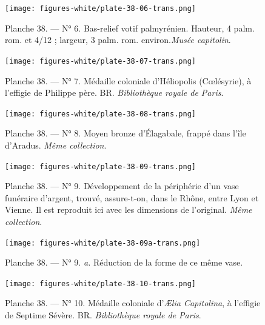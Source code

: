 \documentclass[a4paper, 11pt, oneside, polutonikogreek, french]{article}
\begin{document}
\begin{figure}[H]
\centering
\texttt{[image: figures-white/plate-38-06-trans.png]}
\caption[Planche 38. --- N° 6. Bas-relief votif palmyrénien. Hauteur, 4 palm. rom. et 4/12 ; largeur, 3 palm. rom. environ. \emph{Musée capitolin}.]{\scriptsize Planche 38. --- N° 6. Bas-relief votif palmyrénien. Hauteur, 4 palm. rom. et 4/12 ; largeur, 3 palm. rom. environ.\footnotemark \emph{Musée capitolin}.}
\end{figure}
\vspace*{\fill}
\clearpage
\vspace*{\fill}
\begin{figure}[H]
\centering
\texttt{[image: figures-white/plate-38-07-trans.png]}
\caption{\scriptsize Planche 38. --- N° 7. Médaille coloniale d'Héliopolis (Cœlésyrie), à l'effigie de Philippe père. BR. \emph{Bibliothèque royale de Paris}.}
\end{figure}
\vspace*{\fill}
\clearpage
\vspace*{\fill}
\begin{figure}[H]
\centering
\texttt{[image: figures-white/plate-38-08-trans.png]}
\caption{\scriptsize Planche 38. --- N° 8. Moyen bronze d'Élagabale, frappé dans l'île d'Aradus. \emph{Même collection}.}
\end{figure}
\vspace*{\fill}
\clearpage
\vspace*{\fill}
\begin{figure}[H]
\centering
\texttt{[image: figures-white/plate-38-09-trans.png]}
\caption{\scriptsize Planche 38. --- N° 9. Développement de la périphérie d'un vase funéraire d'argent, trouvé, assure-t-on, dans le Rhône, entre Lyon et Vienne. Il est reproduit ici avec les dimensions de l'original. \emph{Même collection}.}
\end{figure}
\vspace*{\fill}
\clearpage
\vspace*{\fill}
\begin{figure}[H]
\centering
\texttt{[image: figures-white/plate-38-09a-trans.png]}
\caption{\scriptsize Planche 38. --- N° 9. \emph{a.} Réduction de la forme de ce même vase.}
\end{figure}
\vspace*{\fill}
\clearpage
\vspace*{\fill}
\begin{figure}[H]
\centering
\texttt{[image: figures-white/plate-38-10-trans.png]}
\caption{\scriptsize Planche 38. --- N° 10. Médaille coloniale d'\emph{Ælia Capitolina}, à l'effigie de Septime Sévère. BR. \emph{Bibliothèque royale de Paris}.}
\end{figure}
\end{document}
